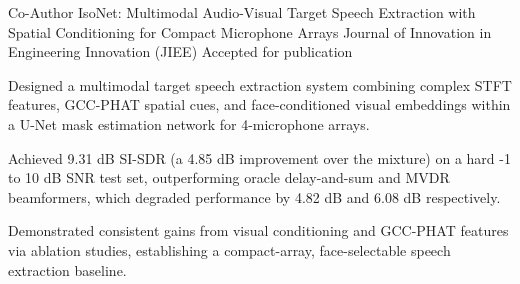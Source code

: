 

\begin{cventries}

  \cventry
    {Co-Author} %
    {IsoNet: Multimodal Audio-Visual Target Speech Extraction with
Spatial Conditioning for Compact Microphone Arrays} %
    {Journal of Innovation in Engineering Innovation (JIEE)} %
    {Accepted for publication} %
    {
      \begin{cvitems} %
        \item {Designed a multimodal target speech extraction system combining complex STFT features, GCC-PHAT spatial cues, and face-conditioned visual embeddings within a U-Net mask estimation network for 4-microphone arrays.}
        \item {Achieved 9.31 dB SI-SDR (a 4.85 dB improvement over the mixture) on a hard -1 to 10 dB SNR test set, outperforming oracle delay-and-sum and MVDR beamformers, which degraded performance by 4.82 dB and 6.08 dB respectively.}
        \item {Demonstrated consistent gains from visual conditioning and GCC-PHAT features via ablation studies, establishing a compact-array, face-selectable speech extraction baseline.}
      \end{cvitems}
    }

\end{cventries}
